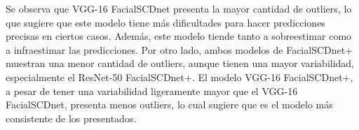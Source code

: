 Se observa que VGG-16 FacialSCDnet presenta la mayor cantidad de outliers, lo que sugiere que este modelo tiene más dificultades para hacer predicciones precisas en ciertos casos. Además, este modelo tiende tanto a sobreestimar como a infraestimar las predicciones. Por otro lado, ambos modelos de FacialSCDnet+ muestran una menor cantidad de outliers, aunque tienen una mayor variabilidad, especialmente el ResNet-50 FacialSCDnet+. El modelo VGG-16 FacialSCDnet+, a pesar de tener una variabilidad ligeramente mayor que el VGG-16 FacialSCDnet, presenta menos outliers, lo cual sugiere que es el modelo más consistente de los presentados.
